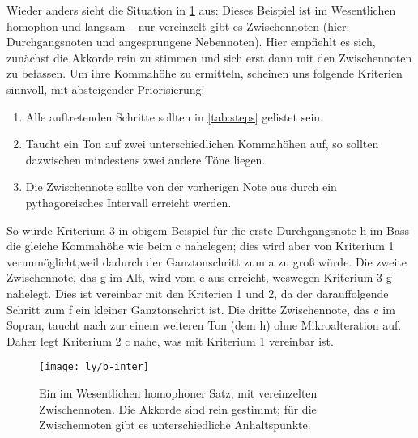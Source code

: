 Wieder anders sieht die Situation in \cref{fig:inter} aus: Dieses Beispiel ist
im Wesentlichen homophon und langsam – nur vereinzelt gibt es Zwischennoten
(hier: Durchgangsnoten und angesprungene Nebennoten). Hier empfiehlt es sich,
zunächst die Akkorde rein zu stimmen und sich erst dann mit den Zwischennoten zu
befassen. Um ihre Kommahöhe zu ermitteln, scheinen uns folgende Kriterien
sinnvoll, mit absteigender Priorisierung:
\begin{enumerate}
\item Alle auftretenden Schritte sollten in \cref{tab:steps} gelistet sein.
\item Taucht ein Ton auf zwei unterschiedlichen Kommahöhen auf, so sollten
  dazwischen mindestens zwei andere Töne liegen.
\item Die Zwischennote sollte von der vorherigen Note aus durch ein
  pythagoreisches Intervall erreicht werden.
\end{enumerate}
So würde Kriterium 3 in obigem Beispiel für die erste Durchgangsnote h im Bass
die gleiche Kommahöhe wie beim c nahelegen; dies wird aber von Kriterium 1
verunmöglicht,weil dadurch der Ganztonschritt zum \naturalm a zu groß würde. Die
zweite Zwischennote, das g im Alt, wird vom \naturalm e aus erreicht, weswegen
Kriterium 3 \naturalm g nahelegt. Dies ist vereinbar mit den Kriterien 1 und 2,
da der darauffolgende Schritt zum f ein kleiner Ganztonschritt ist. Die dritte
Zwischennote, das c im Sopran, taucht nach zur einem weiteren Ton (dem \naturalm
h) ohne Mikroalteration auf. Daher legt Kriterium 2 \natural c nahe, was mit
Kriterium 1 vereinbar ist.


\begin{figure}
  \centering
  \texttt{[image: ly/b-inter]}
  \caption{Ein im Wesentlichen homophoner Satz, mit vereinzelten
    Zwischennoten. Die Akkorde sind rein gestimmt; für die Zwischennoten gibt
    es unterschiedliche Anhaltspunkte.}\label{fig:inter}
\end{figure}

